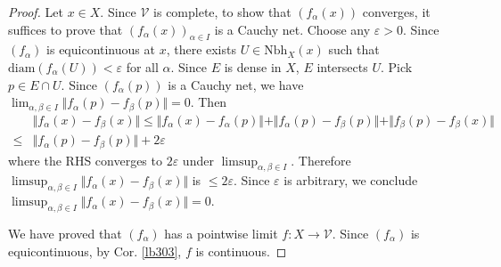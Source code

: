 \documentclass[12pt,b5paper,notitlepage]{article}
\theoremstyle{definition}
\theoremstyle{plain}
\newcommand{\mc}{\mathcal}
\newcommand{\Nbh}{\mathrm{Nbh}}
\newcommand{\diam}{\mathrm{diam}}
\newcommand{\eps}{\varepsilon}
\numberwithin{equation}{section}
\begin{document}
\begin{proof}
Let $x\in X$. Since $\mc V$ is complete, to show that $(f_\alpha(x))$ converges, it suffices to prove that $(f_\alpha(x))_{\alpha\in I}$ is a Cauchy net. Choose any $\eps>0$. Since $(f_\alpha)$ is equicontinuous at $x$, there exists $U\in\Nbh_X(x)$ such that $\diam(f_\alpha(U))<\eps$ for all $\alpha$. Since $E$ is dense in $X$, $E$ intersects $U$. Pick $p\in E\cap U$. Since $(f_\alpha(p))$ is a Cauchy net, we have $\lim_{\alpha,\beta\in I}\Vert f_\alpha(p)-f_\beta(p)\Vert=0$. Then
\begin{align*}
&\Vert f_\alpha(x)-f_\beta(x)\Vert\leq \Vert f_\alpha(x)-f_\alpha(p)\Vert+ \Vert f_\alpha(p)-f_\beta(p)\Vert+  \Vert f_\beta(p)-f_\beta(x)\Vert\\
\leq&\Vert f_\alpha(p)-f_\beta(p)\Vert+2\eps
\end{align*}
where the RHS converges to $2\eps$ under $\limsup_{\alpha,\beta\in I}$. Therefore $\limsup_{\alpha,\beta\in I}\Vert f_\alpha(x)-f_\beta(x)\Vert$ is $\leq 2\eps$. Since $\eps$ is arbitrary, we conclude $\limsup_{\alpha,\beta\in I}\Vert f_\alpha(x)-f_\beta(x)\Vert=0$.

We have proved that $(f_\alpha)$ has a pointwise limit $f:X\rightarrow\mc V$. Since $(f_\alpha)$ is equicontinuous, by Cor. \ref{lb303}, $f$ is continuous.
\end{proof}
\end{document}
